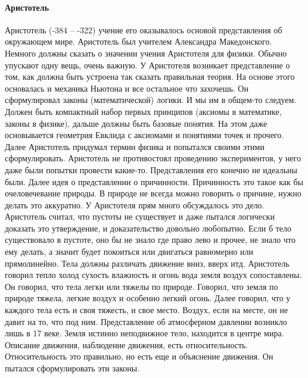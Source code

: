 \documentclass[a4paper, 12pt]{article}
\begin{document}
\paragraph{Аристотель}
Аристотель (-384 -- -322) учение его оказывалось основой представления 
об окружающем мире. Аристотель был учителем Александра Македонского. 
Немного должны сказать о значении учения Аристотеля для физики. Обычно 
упускают одну вещь, очень важную. У Аристотеля возникает представление 
о том, как должна быть устроена так сказать правильная теория. На основе 
этого основалась и механика Ньютона и все остальное что захочешь. Он 
сформулировал законы (математической) логики. И мы им в общем-то 
следуем. Должен быть компактный набор первых принципов (аксиомы 
в математике, законы в физике), дальше должны быть базовые понятия. На 
этом даже основывается геометрия Евклида с аксиомами и понятиями точек 
и прочего. Далее Аристотель придумал термин физика и попытался своими 
этими сформулировать. Аристотель не противостоял проведению 
экспериментов, у него даже были попытки провести какие-то. Представления 
его конечно не идеальны были. Далее идея о представлении о причинности. 
Причинность это такое как бы очеловечевание природы. В природе не всегда 
можно говорить о причине, нужно делать это аккуратно. У Аристотеля прям 
много обсуждалось это дело. Аристотель считал, что пустоты не существует 
и даже пытался логически доказать это утверждение, и доказательство 
довольно любопытно. Если б тело существовало в пустоте, оно бы не знало 
где право лево и прочее, не знало что ему делать, а значит будет 
покоиться или двигаться равномерно или прямолинейно. Тела должны 
различать движение вниз, вверх итд. Аристотель говорил тепло холод 
сухость влажность и огонь вода земля воздух сопоставлены. Он говорил, 
что тела легки или тяжелы по природе. Говорил, что земля по природе 
тяжела, легкие воздух и особенно легкий огонь. Далее говорил, что 
у каждого тела есть и своя тяжесть, и свое место. Воздух, если на месте, 
он не давит на то, что под ним. Представление об атмосферном давлении 
возникло лишь в 17 веке. Земля истинно неподвижное тело, находится 
в центре мира. Описание движения, наблюдение движения, есть 
относительность. Относительность это правильно, но есть еще и объяснение 
движения. Он пытался сформулировать эти законы.
\end{document}
